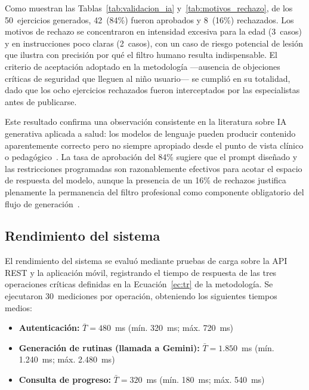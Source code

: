 				Como muestran las Tablas~\ref{tab:validacion_ia} y~\ref{tab:motivos_rechazo}, de los 50~ejercicios generados, 42~(84\%) fueron aprobados y 8~(16\%) rechazados. Los motivos de rechazo se concentraron en intensidad excesiva para la edad (3~casos) y en instrucciones poco claras (2~casos), con un caso de riesgo potencial de lesión que ilustra con precisión por qué el filtro humano resulta indispensable. El criterio de aceptación adoptado en la metodología ---ausencia de objeciones críticas de seguridad que lleguen al niño usuario--- se cumplió en su totalidad, dado que los ocho ejercicios rechazados fueron interceptados por las especialistas antes de publicarse.
				
				Este resultado confirma una observación consistente en la literatura sobre IA generativa aplicada a salud: los modelos de lenguaje pueden producir contenido aparentemente correcto pero no siempre apropiado desde el punto de vista clínico o pedagógico~\cite{Yim2024,Sengar2024}. La tasa de aprobación del 84\% sugiere que el prompt diseñado y las restricciones programadas son razonablemente efectivos para acotar el espacio de respuesta del modelo, aunque la presencia de un 16\% de rechazos justifica plenamente la permanencia del filtro profesional como componente obligatorio del flujo de generación~\cite{GuerreroUlloa2024}.
				
				\subsection{Rendimiento del sistema}
				
				El rendimiento del sistema se evaluó mediante pruebas de carga sobre la API REST y la aplicación móvil, registrando el tiempo de respuesta de las tres operaciones críticas definidas en la Ecuación~\eqref{ec:tr} de la metodología. Se ejecutaron 30~mediciones por operación, obteniendo los siguientes tiempos medios:
				
				\begin{itemize}
					\item \textbf{Autenticación:} $\bar{T} = 480$~ms (mín. 320~ms; máx. 720~ms)
					\item \textbf{Generación de rutinas (llamada a Gemini):} $\bar{T} = 1{.}850$~ms (mín. 1{.}240~ms; máx. 2{.}480~ms)
					\item \textbf{Consulta de progreso:} $\bar{T} = 320$~ms (mín. 180~ms; máx. 540~ms)
				\end{itemize}
				
